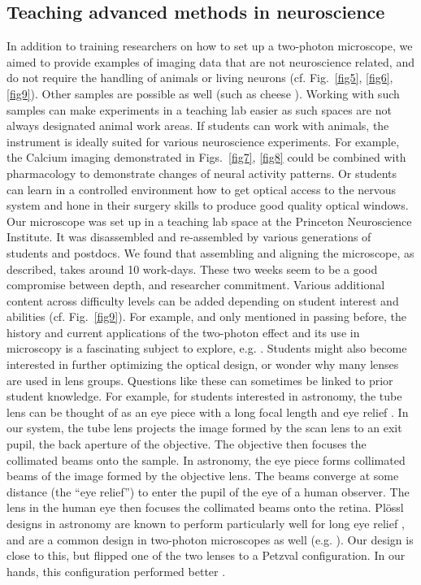 \documentclass[10pt,letterpaper]{article}
\begin{document}
\subsection*{Teaching advanced methods in neuroscience}
In addition to training researchers on how to set up a two-photon microscope, we aimed to provide examples of imaging data that are not neuroscience related, and do not require the handling of animals or living neurons (cf. Fig.~\ref{fig5}, \ref{fig6}, \ref{fig9}). Other samples are possible as well (such as cheese \cite{Nguyen2001}). Working with such samples can make experiments in a teaching lab easier as such spaces are not always designated animal work areas. If students can work with animals, the instrument is ideally suited for various neuroscience experiments. For example, the Calcium imaging demonstrated in Figs.~\ref{fig7}, \ref{fig8} could be combined with pharmacology to demonstrate changes of neural activity patterns. Or students can learn in a controlled environment how to get optical access to the nervous system and hone in their surgery skills to produce good quality optical windows\cite{Holtmaat2009, Grienberger2022}.
Our microscope was set up in a teaching lab space at the Princeton Neuroscience Institute. It was disassembled and re-assembled by various generations of students and postdocs. We found that assembling and aligning the microscope, as described, takes around 10 work-days. These two weeks seem to be a good compromise between depth, and researcher commitment. Various additional content across difficulty levels can be added depending on student interest and abilities (cf. Fig.~\ref{fig9}). For example, and only mentioned in passing before, the history and current applications of the two-photon effect and its use in microscopy is a fascinating subject to explore, e.g. \cite{Sheppard2020, Yao2023}.\newline 
Students might also become interested in further optimizing the optical design, or wonder why many lenses are used in lens groups. Questions like these can sometimes be linked to prior student knowledge. For example, for students interested in astronomy, the tube lens can be thought of as an eye piece with a long focal length and eye relief \cite{Smith2007}. In our system, the tube lens projects the image formed by the scan lens to an exit pupil, the back aperture of the objective. The objective then focuses the collimated beams onto the sample. In astronomy, the eye piece forms collimated beams of the image formed by the objective lens. The beams converge at some distance (the ``eye relief'') to enter the pupil of the eye of a human observer. The lens in the human eye then focuses the collimated beams onto the retina. Pl\"ossl designs in astronomy are known to perform particularly well for long eye relief \cite{Smith2007, Nagler1983}, and are a common design in two-photon microscopes as well (e.g. \cite{Rupprecht2024}). Our design is close to this, but flipped one of the two lenses to a Petzval configuration. In our hands, this configuration performed better \cite{Hong2022, Bumstead2018, Mayrhofer2015}.\newline
\end{document}
